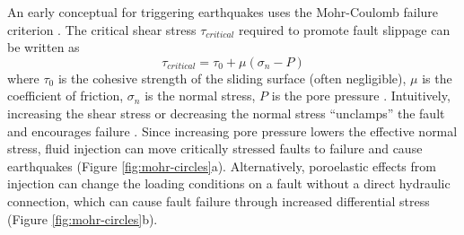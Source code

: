 An early conceptual for triggering earthquakes uses the Mohr-Coulomb failure criterion \citep{Hubbert1959RoleFluidPressure}.
The critical shear stress $\tau_{critical}$ required to promote fault slippage can be written as
\begin{equation}
\tau_{critical} = \tau_0 + \mu (\sigma_n - P)
\end{equation}
where $\tau_0$ is the cohesive strength of the sliding surface (often negligible), $\mu$ is the coefficient of friction, $\sigma_n$ is the normal stress, $P$ is the pore pressure \citep{Nicholson1990EarthquakeHazardAssociated, Ellsworth2013InjectionInducedEarthquakes}. Intuitively, increasing the shear stress or decreasing the normal stress ``unclamps'' the fault and encourages failure \citep{Shearer2019IntroductionSeismology}. Since increasing pore pressure lowers the effective normal stress, fluid injection can move critically stressed faults to failure and cause earthquakes (Figure \ref{fig:mohr-circles}a).
Alternatively, poroelastic effects from injection can change the loading conditions on a fault without a direct hydraulic connection, which can cause fault failure through increased differential stress (Figure \ref{fig:mohr-circles}b).








